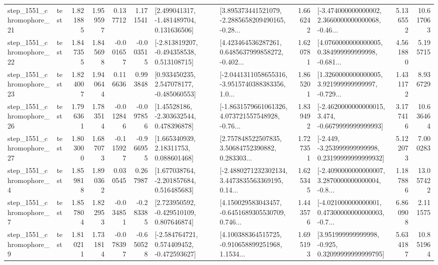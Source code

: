 \begin{tabular}{llrrrrllrlrr}
 step\_1551\_chromophore\_21 &      test &      1.821885 &    1.959597 &      0.137712 &  1.171541 &    [2.499041317, -1.481489704, 0.131636506] &  [3.895373441521079, -2.2885658209490165, -0.28... &       1.666242 &  [-3.474000000000002, 2.3660000000000068, -0.46... &            5.136552 &         10.617063 \\
 step\_1551\_chromophore\_22 &      test &      1.847355 &    1.845698 &     -0.001657 & -0.003515 &   [-2.813819207, -0.494358538, 0.513108715] &  [4.423464536287261, 0.6485637999858272, -0.402... &       1.620781 &  [4.0760000000000005, 0.384999999999998, -0.681... &            4.561880 &          5.195715 \\
 step\_1551\_chromophore\_23 &      test &      1.824007 &    1.940644 &      0.116636 &  0.993848 &    [0.933450235, 2.547078177, -0.485060553] &  [-2.0441311058655316, -3.9515740388383356, 1.0... &       1.865201 &  [1.3260000000000005, 3.921999999999997, -0.729... &            1.431172 &          8.936729 \\
 step\_1551\_chromophore\_26 &      test &      1.796361 &    1.783514 &     -0.012846 & -0.097856 &     [1.45528186, -2.303632544, 0.478396878] &  [-1.8631579661061326, 4.073721557548928, -0.76... &       1.839492 &  [-2.4620000000000015, 3.474, -0.6679999999999993] &            3.177416 &         10.636464 \\
 step\_1551\_chromophore\_27 &      test &      1.803000 &    1.687073 &     -0.115927 & -0.966955 &      [1.665340939, 2.18311753, 0.088601468] &  [2.757848522507835, 3.50684752390882, 0.283303... &       1.727351 &  [-2.449, -3.253999999999998, 0.23199999999999932] &            5.122073 &          7.000283 \\
  step\_1551\_chromophore\_4 &      test &      1.859818 &    1.890362 &      0.030545 &  0.267987 &    [1.677038764, -2.201857684, 0.516485683] &  [-2.4880271232302134, 3.4473835563369195, 0.14... &       1.625345 &  [-2.4090000000000007, 3.2870000000000004, -0.8... &            1.187886 &         13.057422 \\
  step\_1551\_chromophore\_7 &      test &      1.857804 &    1.822953 &     -0.034851 & -0.283385 &    [2.723950592, -0.429510109, 0.807646874] &  [4.150029583043457, -0.6451689305530709, 0.746... &       1.443576 &  [-4.021000000000001, 0.47300000000000003, -0.7... &            6.860908 &          2.111575 \\
  step\_1551\_chromophore\_9 &      test &      1.810211 &    1.731814 &     -0.078397 & -0.650528 &   [-2.584764721, 0.574409452, -0.472593627] &  [4.100388364515725, -0.910658899251968, 1.1534... &       1.695193 &   [3.951999999999998, -0.925, 0.32099999999999795] &            5.634187 &         10.851964 \\

\end{tabular}
